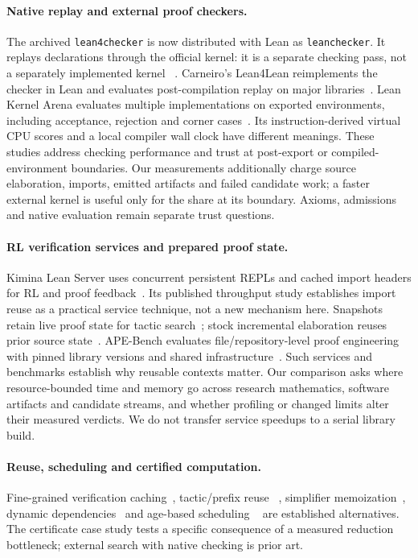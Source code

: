 \documentclass[10pt,twocolumn]{article}
\begin{document}
\paragraph{Native replay and external proof checkers.}
The archived \texttt{lean4checker} is now distributed with Lean as
\texttt{leanchecker}. It replays declarations through the official kernel:
it is a separate checking pass, not a separately implemented kernel
~\cite{leanCheckerDocs}.
Carneiro's Lean4Lean reimplements the checker in Lean and evaluates
post-compilation replay on major libraries~\cite{lean4lean2025}.
Lean Kernel Arena evaluates multiple implementations on exported environments,
including acceptance, rejection and corner cases~\cite{leanArena}.
Its instruction-derived virtual CPU scores and a local compiler wall clock
have different meanings.
These studies address checking performance and trust at post-export or
compiled-environment boundaries. Our measurements additionally charge
source elaboration, imports, emitted artifacts and failed candidate work;
a faster external kernel is useful only for the share at its boundary.
Axioms, admissions and native evaluation remain separate trust questions.

\paragraph{RL verification services and prepared proof state.}
Kimina Lean Server uses concurrent persistent REPLs and cached import headers
for RL and proof feedback~\cite{kimina,kiminaPaper}.
Its published throughput study establishes import reuse as a practical
service technique, not a new mechanism here.
Snapshots retain live proof state for tactic search~\cite{leanSnapshot};
stock incremental elaboration reuses prior source state~\cite{leanIncremental}.
APE-Bench evaluates file/repository-level proof engineering with pinned
library versions and shared infrastructure~\cite{apeBench2026}.
Such services and benchmarks establish why reusable contexts matter.
Our comparison asks where resource-bounded time and memory go across
research mathematics, software artifacts and candidate streams, and whether
profiling or changed limits alter their measured verdicts.
We do not transfer service speedups to a serial library build.

\paragraph{Reuse, scheduling and certified computation.}
Fine-grained verification caching~\cite{boogieCache}, tactic/prefix reuse
~\cite{tactician2020,shred}, simplifier memoization~\cite{leanSimpCache},
dynamic dependencies~\cite{salsaDependencies,adapton} and age-based scheduling
~\cite{lubyRestart1993,soap2018} are established alternatives.
The certificate case study tests a specific consequence of a measured
reduction bottleneck; external search with native checking is prior art.
\end{document}
